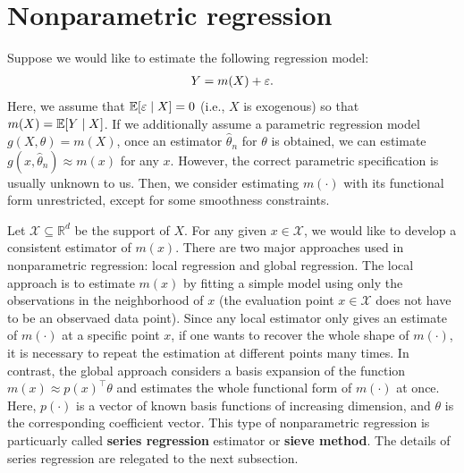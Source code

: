 \documentclass[11pt, A4paper, openany, uplatex]{book}
\begin{document}
\section{Nonparametric regression}

Suppose we would like to estimate the following regression model:
\begin{align*}
	Y = m(X) + \varepsilon.
\end{align*}
Here, we assume that $\mathbb{E}[\varepsilon \mid X] = 0$ (i.e., $X$ is exogenous) so that $m(X) = \mathbb{E}[Y \mid X]$.
If we additionally assume a parametric regression model $g(X, \theta) = m(X)$, once an estimator $\hat \theta_n$ for $\theta$ is obtained, we can estimate $g(x, \hat \theta_n) \approx m(x)$ for any $x$.
However, the correct parametric specification is usually unknown to us.
Then, we consider estimating $m(\cdot)$ with its functional form unrestricted, except for some smoothness constraints.

Let $\mathcal{X} \subseteq \mathbb{R}^d$ be the support of $X$.
For any given $x \in \mathcal{X}$, we would like to develop a consistent estimator of $m(x)$.
There are two major approaches used in nonparametric regression: local regression and global regression.
The local approach is to estimate $m(x)$ by fitting a simple model using only the observations in the neighborhood of $x$ (the evaluation point $x \in \mathcal{X}$ does not have to be an observaed data point).
Since any local estimator only gives an estimate of $m(\cdot)$ at a specific point $x$, if one wants to recover the whole shape of $m(\cdot)$, it is necessary to repeat the estimation at different points many times.
In contrast, the global approach considers a basis expansion of the function $m(x)\approx p(x)^\top \theta$ and estimates the whole functional form of $m(\cdot)$ at once.
Here, $p(\cdot)$ is a vector of known basis functions of increasing dimension, and $\theta$ is the corresponding coefficient vector.
This type of nonparametric regression is particuarly called \textbf{series regression} estimator or \textbf{sieve method}.
The details of series regression are relegated to the next subsection.
\end{document}
